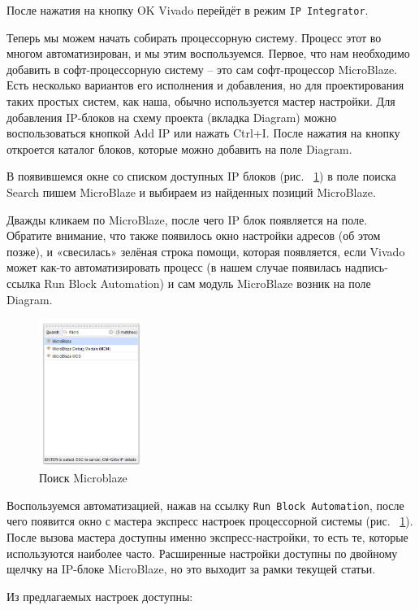 \documentclass[a4paper,oneside ,10pt]{extreport}
\begin{document}
После нажатия на кнопку OK Vivado перейдёт в режим \verb|IP Integrator|.

Теперь мы можем начать собирать процессорную систему. Процесс этот во 
многом автоматизирован, и мы этим воспользуемся. Первое, что нам необходимо 
добавить в софт-процессорную систему – это сам софт-процессор MicroBlaze. Есть 
несколько вариантов его исполнения и добавления, но для проектирования таких 
простых систем, как наша, обычно используется мастер настройки. Для добавления 
IP-блоков на схему проекта (вкладка Diagram) можно воспользоваться кнопкой
Add IP или нажать Ctrl+I. После нажатия на кнопку откроется каталог блоков, которые можно 
добавить на поле Diagram.

В появившемся окне со списком доступных IP блоков (рис. ~\ref{m_16}) в поле поиска 
Search пишем MicroBlaze и выбираем из найденных позиций MicroBlaze.

Дважды кликаем по MicroBlaze, после чего IP блок появляется на поле. 
Обратите внимание, что также появилось окно настройки адресов (об этом 
позже), и «свесилась» зелёная строка помощи, которая появляется, если Vivado
может как-то автоматизировать процесс (в нашем случае появилась надпись-ссылка
Run Block Automation) и сам модуль MicroBlaze возник на поле Diagram.

\begin{figure}[!ht]
	\centering
	\includegraphics[width=0.3\textwidth]{image/m_16.png}
	\caption{Поиск Microblaze}
	\label{m_16}
\end{figure}

Воспользуемся автоматизацией, нажав на ссылку \verb|Run Block Automation|, после чего появится окно с мастера экспресс настроек процессорной 
системы (рис. ~\ref{m_16}). После вызова мастера доступны именно экспресс-настройки, то 
есть те, которые используются наиболее часто. Расширенные настройки доступны
по двойному щелчку на IP-блоке MicroBlaze, но это выходит за рамки текущей 
статьи.

Из предлагаемых настроек доступны:
\end{document}
